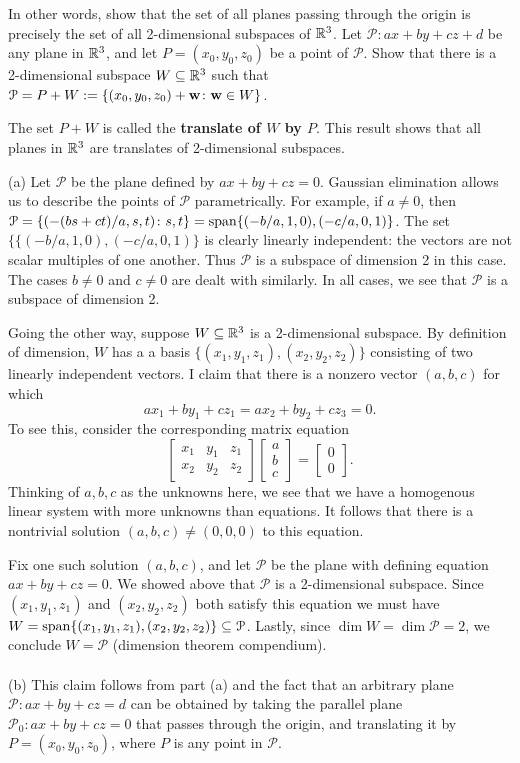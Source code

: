 In other words, show that the set of all planes passing through the origin is  precisely the set of all 2-dimensional subspaces of ${\mathbb R}^3$. 
\ii Let $\mathcal{P}\colon ax+by+cz+d$ be any plane in ${\mathbb R}^3$, and let $P=(x_0,y_0,z_0)$ be a point of $\mathcal{P}$. Show that there is a 2-dimensional subspace $W\subseteq {\mathbb R}^3$ such that $\mathcal{P}=P+W:=\{(x_0,y_0,z_0)+{\mathbf w}\colon {\mathbf w}\in W\}$. 

The set $P+W$ is called the {\bf translate of $W$ by $P$}. This result shows that all planes in ${\mathbb R}^3$ are translates of 2-dimensional subspaces.   
\ee
\begin{solution}
\noindent 
(a) Let $\mathcal{P}$ be the plane defined by $ax+by+cz=0$. Gaussian elimination allows us to describe the points of $\mathcal{P}$ parametrically. For example, if $a\ne 0$, then $\mathcal{P}=\{(-(bs+ct)/a, s, t)\colon s, t\}=\operatorname{span}\{(-b/a, 1,0),(-c/a,0,1)\}$. The set $\{\{(-b/a, 1,0),(-c/a,0,1)\}$ is clearly linearly independent: the vectors are not scalar multiples of one another. Thus $\mathcal{P}$ is a subspace of dimension 2 in this case. The cases $b\ne 0$ and $c\ne 0$ are dealt with similarly. In all cases, we see that $\mathcal{P}$ is a subspace of dimension 2. 

Going the other way, suppose $W\subseteq {\mathbb R}^3$ is a 2-dimensional subspace. By definition of dimension, $W$ has a a basis $\{(x_1,y_1,z_1), (x_2, y_2, z_2)\}$ consisting of two linearly independent vectors. I claim that there is a nonzero vector $(a,b,c)$ for which 
\[
ax_1+by_1+cz_1=ax_2+by_2+cz_3=0.
\]
To see this, consider the corresponding matrix equation
\[
\begin{bmatrix}
x_1&y_1&z_1\\
x_2&y_2&z_2
\end{bmatrix}\begin{bmatrix}
a\\ b\\ c
\end{bmatrix}=\begin{bmatrix}
0 \\ 0
\end{bmatrix}.
\]
Thinking of $a, b, c$ as the unknowns here, we see that we have a homogenous linear system with more unknowns  than equations. It follows that there is a nontrivial solution $(a,b,c)\ne (0,0,0)$ to this equation.  

Fix one such solution $(a,b,c)$, and let $\mathcal{P}$ be the plane with defining equation $ax+by+cz=0$. We showed above that $\mathcal{P}$ is a 2-dimensional subspace. Since $(x_1,y_1,z_1)$ and $(x_2,y_2,z_2)$ both satisfy this equation we must have $W=\operatorname{span} \{(x_1,y_1,z_1), (x_2, y_2, z_2)\}\subseteq\mathcal{P}$. Lastly, since $\dim W=\dim\mathcal{P}=2$, we conclude $W=\mathcal{P}$ (dimension theorem compendium). 
\\
\\
(b) This claim follows from part (a) and the fact that an arbitrary plane $\mathcal{P}\colon ax+by+cz=d$ can be obtained by taking the parallel plane $\mathcal{P}_0\colon ax+by+cz=0$ that passes through the origin,  and translating it by $P=(x_0,y_0,z_0)$, where $P$ is any point in $\mathcal{P}$. 
\end{solution}
